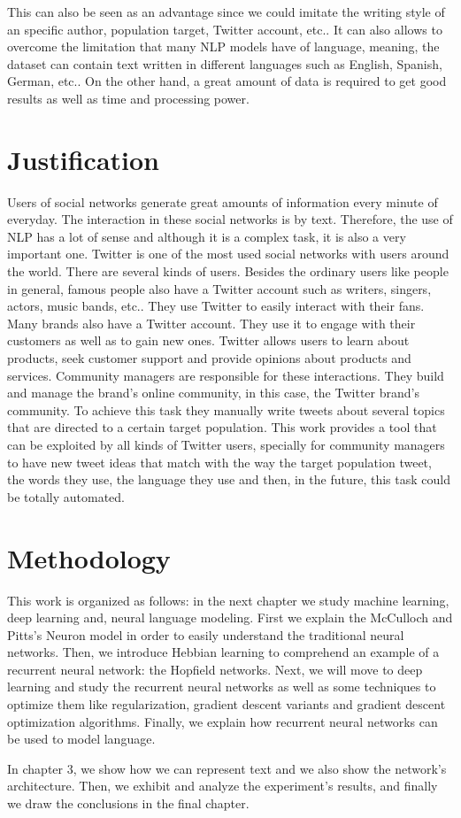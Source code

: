 This can also be seen as an advantage since  we could imitate the writing style of an specific author, population target, Twitter account, etc.. It can also allows to overcome the limitation that many NLP models have of language, meaning, the dataset can contain text written in different languages such as English, Spanish, German, etc.. On the other hand, a great amount of data is required to get good results as well as time and processing power. 

\section{Justification}

Users of  social networks generate great amounts of information every minute of everyday. The interaction in these social networks is by text. Therefore, the use of NLP has a lot of sense and although it is a complex task, it is also a very important one.
Twitter is one of the most used social networks with users around the world.  There are several kinds of users. Besides the ordinary users like people in general, famous people also have a Twitter account such as writers, singers, actors, music bands, etc.. They use Twitter to easily interact with their fans.  Many brands also have  a Twitter account. They use it to engage with their customers as well as to gain new ones. Twitter allows users to learn about products, seek customer support and provide opinions about products and services. Community managers are responsible for these interactions. They build and manage the brand's online community, in this case, the Twitter brand's community. To achieve this task they manually write tweets about several topics that are directed to a certain target population. This work provides a tool that can be exploited by all kinds of Twitter users, specially for community managers to have new tweet ideas that match with the way the target population tweet, the words they use, the language they use and then, in the future, this task could be totally automated.

\section{Methodology}
This work is organized as follows: in the next chapter we study machine learning, deep learning and, neural language modeling. First we explain the McCulloch and Pitts's Neuron model in order to easily understand the traditional neural networks. Then, we introduce Hebbian learning to comprehend an example of a recurrent neural network: the Hopfield networks. Next, we will move to deep learning and study the recurrent neural networks as well as some techniques to optimize them like regularization, gradient descent variants and gradient descent optimization algorithms. Finally, we explain how recurrent neural networks can be used to model language. 

In  chapter 3, we show how we can represent text and we also show the network's architecture. Then, we exhibit and analyze  the experiment's results, and finally we draw the conclusions in the final chapter.

